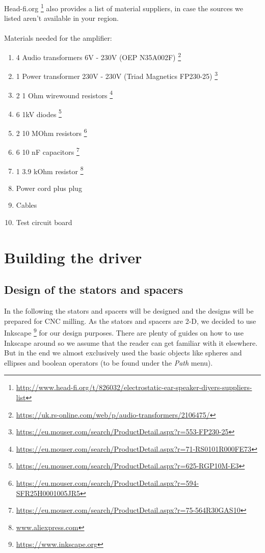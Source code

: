 \documentclass{article}
\begin{document}
Head-fi.org \footnote{\url{http://www.head-fi.org/t/826032/electrostatic-ear-speaker-diyers-suppliers-list}} also provides a list of material suppliers, in case the sources we listed aren't available in your region.
\\
\\
Materials needed for the amplifier:
\begin{enumerate}
    \item 4 Audio transformers 6V - 230V (OEP N35A002F) \footnote{\url{https://uk.rs-online.com/web/p/audio-transformers/2106475/}}
    \item 1 Power transformer 230V - 230V (Triad Magnetics FP230-25) \footnote{\url{https://eu.mouser.com/search/ProductDetail.aspx?r=553-FP230-25}}
    \item 2 1 Ohm wirewound resistors \footnote{\url{https://eu.mouser.com/search/ProductDetail.aspx?r=71-RS0101R000FE73}}
    \item 6 1kV diodes \footnote{\url{https://eu.mouser.com/search/ProductDetail.aspx?r=625-RGP10M-E3}}
    \item 2 10 MOhm resistors \footnote{\url{https://eu.mouser.com/search/ProductDetail.aspx?r=594-SFR25H0001005JR5}}
    \item 6 10 nF capacitors \footnote{\url{https://eu.mouser.com/search/ProductDetail.aspx?r=75-564R30GAS10}}
    \item 1 3.9 kOhm resistor \footnote{\url{www.aliexpress.com}}
    \item Power cord plus plug
    \item Cables
    \item Test circuit board
\end{enumerate}

\section{Building the driver}
\label{s:driver}

\subsection{Design of the stators and spacers}
\label{s:driver:design}
In the following the stators and spacers will be designed and the designs will be prepared for CNC milling. As the stators and spacers are 2-D, we decided to use Inkscape \footnote{\url{https://www.inkscape.org}} for our design purposes. There are plenty of guides on how to use Inkscape around so we assume that the reader can get familiar with it elsewhere. But in the end we almost exclusively used the basic objects like spheres and ellipses and boolean operators (to be found under the \textit{Path} menu).
\end{document}
